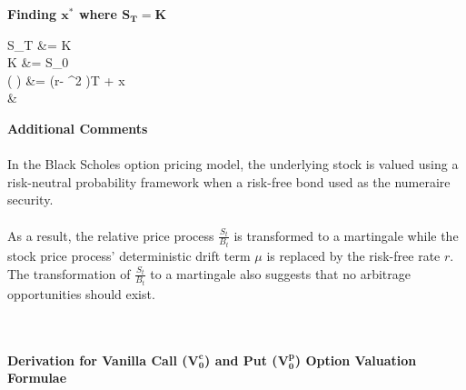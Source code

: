 \documentclass{article}
\begin{document}
\begin{minipage}[t]{0.5\textwidth}
	\begin{tcolorbox}[height=11.5cm,boxsep=5pt,arc=0pt,auto outer arc,colback=white,colframe=black]
		\noindent \textbf{Finding $\boldsymbol{x^*}$ where $\boldsymbol{S_T=K}$}
		\begin{flalign*}
		S_T &= K\\
		K &= S_0 \exp{}\\
		\log \left(  \right) &= \left(r- \sigma^2 \right)T + \sigma {} x\\
		&
		\end{flalign*}
		\noindent \textbf{Additional Comments}\\ \\
		In the Black Scholes option pricing model, the underlying stock is valued using a risk-neutral probability framework when a risk-free bond used as the numeraire security. \\ \\ As a result, the relative price process $\frac{S_t}{B_t}$ is transformed to a martingale while the stock price process' deterministic drift term $\mu$ is replaced by the risk-free rate $r$. The transformation of $\frac{S_t}{B_t}$ to a martingale also suggests that no arbitrage opportunities should exist.
	\end{tcolorbox}
\end{minipage} \\ \\
\noindent \textbf{Derivation for Vanilla Call ($\boldsymbol{V_0^c}$) and Put ($\boldsymbol{V_0^p}$) Option Valuation Formulae}
\end{document}
